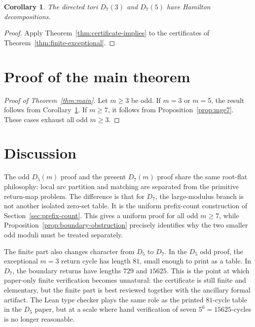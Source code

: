 \documentclass[11pt]{article}
\newtheorem{corollary}{Corollary}
\theoremstyle{definition}
\begin{document}
\begin{corollary}\label{cor:exceptional}
The directed tori \(D_7(3)\) and \(D_7(5)\) have Hamilton decompositions.
\end{corollary}

\begin{proof}
Apply Theorem~\ref{thm:certificate-implies} to the certificates of
Theorem~\ref{thm:finite-exceptional}.
\end{proof}

\section{Proof of the main theorem}

\begin{proof}[Proof of Theorem~\ref{thm:main}]
Let \(m\ge3\) be odd.  If \(m=3\) or \(m=5\), the result follows from
Corollary~\ref{cor:exceptional}.  If \(m\ge7\), it follows from Proposition~\ref{prop:mge7}.  These cases
exhaust all odd \(m\ge3\).
\end{proof}

\section{Discussion}

The odd \(D_5(m)\) proof and the present \(D_7(m)\) proof share the same root-flat philosophy: local
arc partition and matching are separated from the primitive return-map problem.  The difference is that
for \(D_7\), the large-modulus branch is not another isolated zero-set table.  It is the uniform
prefix-count construction of Section~\ref{sec:prefix-count}.  This gives a uniform proof for all
odd \(m\ge7\), while Proposition~\ref{prop:boundary-obstruction} precisely identifies why the two smaller
odd moduli must be treated separately.

The finite part also changes character from \(D_5\) to \(D_7\).  In the \(D_5\) odd proof, the exceptional
\(m=3\) return cycle has length \(81\), small enough to print as a table.  In \(D_7\), the boundary
returns have lengths \(729\) and \(15625\).  This is the point at which paper-only finite verification
becomes unnatural: the certificate is still finite and elementary, but the finite part is best reviewed together with the ancillary formal artifact.  The Lean type checker plays the same role as the printed \(81\)-cycle table in the
\(D_5\) paper, but at a scale where hand verification of seven \(5^6=15625\)-cycles is no longer reasonable.
\end{document}
